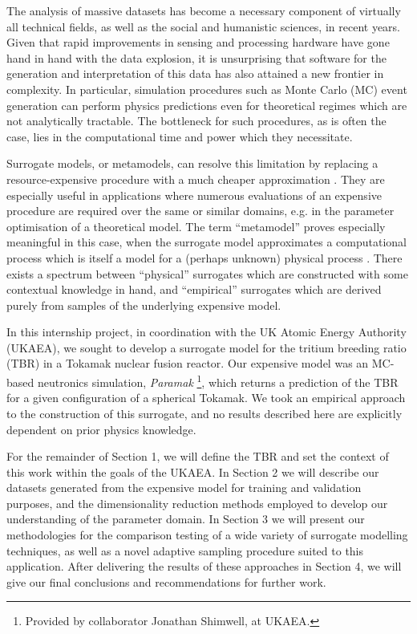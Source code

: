 The analysis of massive datasets has become a necessary component of virtually all technical fields, as well as the social and humanistic sciences, in recent years. Given that rapid improvements in sensing and processing hardware have gone hand in hand with the data explosion, it is unsurprising that software for the generation and interpretation of this data has also attained a new frontier in complexity. In particular, simulation procedures such as Monte Carlo (MC) event generation can perform physics predictions even for theoretical regimes which are not analytically tractable. The bottleneck for such procedures, as is often the case, lies in the computational time and power which they necessitate.

Surrogate models, or metamodels, can resolve this limitation by replacing a
resource-expensive procedure with a much cheaper approximation
\cite{Sondergaard2003}. They are especially useful in applications where
numerous evaluations of an expensive procedure are required over the same or
similar domains, e.g. in the parameter optimisation of a theoretical model. The
term ``metamodel'' proves especially meaningful in this case, when the surrogate
model approximates a computational process which is itself a model for a
(perhaps unknown) physical process \cite{Myers2002}. There exists a spectrum
between ``physical'' surrogates which are constructed with some contextual
knowledge in hand, and ``empirical'' surrogates which are derived purely from
samples of the underlying expensive model.

In this internship project, in coordination with the UK Atomic Energy Authority (UKAEA), we sought to develop a surrogate model for the tritium breeding ratio (TBR) in a Tokamak nuclear fusion reactor. Our expensive model was an MC-based neutronics simulation, \textit{Paramak} \footnote{Provided by collaborator Jonathan Shimwell, at UKAEA.}, which returns a prediction of the TBR for a given configuration of a spherical Tokamak. We took an empirical approach to the construction of this surrogate, and no results described here are explicitly dependent on prior physics knowledge.

For the remainder of Section 1, we will define the TBR and set the context of this work within the goals of the UKAEA. In Section 2 we will describe our datasets generated from the expensive model for training and validation purposes, and the dimensionality reduction methods employed to develop our understanding of the parameter domain. In Section 3 we will present our methodologies for the comparison testing of a wide variety of surrogate modelling techniques, as well as a novel adaptive sampling procedure suited to this application. After delivering the results of these approaches in Section 4, we will give our final conclusions and recommendations for further work.

